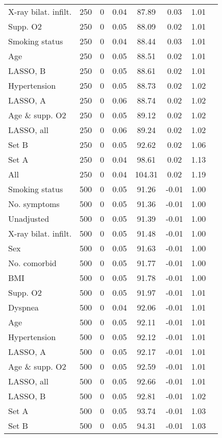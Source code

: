 \documentclass{article}
\begin{document}
{\begin{longtable}{lccccccc}
X-ray bilat. infilt. & 250 & 0 & 0.04 & 87.89 & 0.03 & 1.01\\
Supp. O2 & 250 & 0 & 0.05 & 88.09 & 0.02 & 1.01\\
Smoking status & 250 & 0 & 0.04 & 88.44 & 0.03 & 1.01\\
Age & 250 & 0 & 0.05 & 88.51 & 0.02 & 1.01\\
LASSO, B & 250 & 0 & 0.05 & 88.61 & 0.02 & 1.01\\
Hypertension & 250 & 0 & 0.05 & 88.73 & 0.02 & 1.02\\
LASSO, A & 250 & 0 & 0.06 & 88.74 & 0.02 & 1.02\\
Age \& supp. O2 & 250 & 0 & 0.05 & 89.12 & 0.02 & 1.02\\
LASSO, all & 250 & 0 & 0.06 & 89.24 & 0.02 & 1.02\\
Set B & 250 & 0 & 0.05 & 92.62 & 0.02 & 1.06\\
Set A & 250 & 0 & 0.04 & 98.61 & 0.02 & 1.13\\
All & 250 & 0 & 0.04 & 104.31 & 0.02 & 1.19\\ \midrule
Smoking status & 500 & 0 & 0.05 & 91.26 & -0.01 & 1.00\\
No. symptoms & 500 & 0 & 0.05 & 91.36 & -0.01 & 1.00\\
Unadjusted & 500 & 0 & 0.05 & 91.39 & -0.01 & 1.00\\
X-ray bilat. infilt. & 500 & 0 & 0.05 & 91.48 & -0.01 & 1.00\\
Sex & 500 & 0 & 0.05 & 91.63 & -0.01 & 1.00\\
No. comorbid & 500 & 0 & 0.05 & 91.77 & -0.01 & 1.00\\
BMI & 500 & 0 & 0.05 & 91.78 & -0.01 & 1.00\\
Supp. O2 & 500 & 0 & 0.05 & 91.97 & -0.01 & 1.01\\
Dyspnea & 500 & 0 & 0.04 & 92.06 & -0.01 & 1.01\\
Age & 500 & 0 & 0.05 & 92.11 & -0.01 & 1.01\\
Hypertension & 500 & 0 & 0.05 & 92.12 & -0.01 & 1.01\\
LASSO, A & 500 & 0 & 0.05 & 92.17 & -0.01 & 1.01\\
Age \& supp. O2 & 500 & 0 & 0.05 & 92.59 & -0.01 & 1.01\\
LASSO, all & 500 & 0 & 0.05 & 92.66 & -0.01 & 1.01\\
LASSO, B & 500 & 0 & 0.05 & 92.81 & -0.01 & 1.02\\
Set A & 500 & 0 & 0.05 & 93.74 & -0.01 & 1.03\\
Set B & 500 & 0 & 0.05 & 94.31 & -0.01 & 1.03\\

\end{longtable}}
\end{document}
